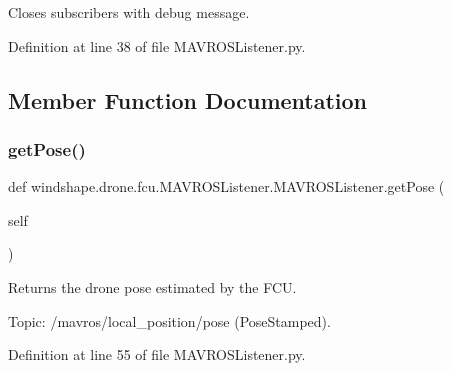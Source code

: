 \begin{DoxyVerb}Closes subscribers with debug message.\end{DoxyVerb}
 

Definition at line 38 of file M\+A\+V\+R\+O\+S\+Listener.\+py.



\subsection{Member Function Documentation}
\mbox{\label{classwindshape_1_1drone_1_1fcu_1_1_m_a_v_r_o_s_listener_1_1_m_a_v_r_o_s_listener_a7ded0f686fc683775ed94a7481bacea4}} 
\subsubsection{\texorpdfstring{get\+Pose()}{getPose()}}
{\footnotesize\ttfamily def windshape.\+drone.\+fcu.\+M\+A\+V\+R\+O\+S\+Listener.\+M\+A\+V\+R\+O\+S\+Listener.\+get\+Pose (\begin{DoxyParamCaption}\item[{}]{self }\end{DoxyParamCaption})}

\begin{DoxyVerb}Returns the drone pose estimated by the FCU.

Topic: /mavros/local_position/pose (PoseStamped).
\end{DoxyVerb}
 

Definition at line 55 of file M\+A\+V\+R\+O\+S\+Listener.\+py.

